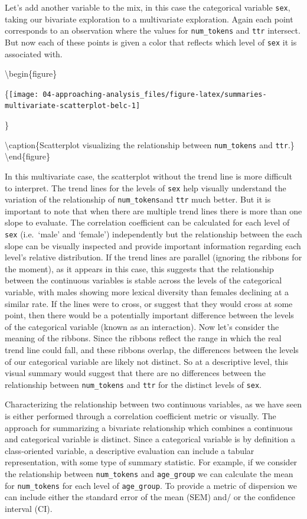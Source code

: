 \documentclass[
]{article}
\begin{document}
Let's add another variable to the mix, in this case the categorical variable \texttt{sex}, taking our bivariate exploration to a multivariate exploration. Again each point corresponds to an observation where the values for \texttt{num\_tokens} and \texttt{ttr} intersect. But now each of these points is given a color that reflects which level of \texttt{sex} it is associated with.

\textbackslash begin\{figure\}

\{\centering \texttt{[image: 04-approaching-analysis\_files/figure-latex/summaries-multivariate-scatterplot-belc-1]}

\}

\textbackslash caption\{Scatterplot visualizing the relationship between \texttt{num\_tokens} and \texttt{ttr}.\}\label{fig:summaries-multivariate-scatterplot-belc}
\textbackslash end\{figure\}

In this multivariate case, the scatterplot without the trend line is more difficult to interpret. The trend lines for the levels of \texttt{sex} help visually understand the variation of the relationship of \texttt{num\_tokens}and \texttt{ttr} much better. But it is important to note that when there are multiple trend lines there is more than one slope to evaluate. The correlation coefficient can be calculated for each level of \texttt{sex} (i.e.~`male' and `female') independently but the relationship between the each slope can be visually inspected and provide important information regarding each level's relative distribution. If the trend lines are parallel (ignoring the ribbons for the moment), as it appears in this case, this suggests that the relationship between the continuous variables is stable across the levels of the categorical variable, with males showing more lexical diversity than females declining at a similar rate. If the lines were to cross, or suggest that they would cross at some point, then there would be a potentially important difference between the levels of the categorical variable (known as an interaction). Now let's consider the meaning of the ribbons. Since the ribbons reflect the range in which the real trend line could fall, and these ribbons overlap, the differences between the levels of our categorical variable are likely not distinct. So at a descriptive level, this visual summary would suggest that there are no differences between the relationship between \texttt{num\_tokens} and \texttt{ttr} for the distinct levels of \texttt{sex}.

Characterizing the relationship between two continuous variables, as we have seen is either performed through a correlation coefficient metric or visually. The approach for summarizing a bivariate relationship which combines a continuous and categorical variable is distinct. Since a categorical variable is by definition a class-oriented variable, a descriptive evaluation can include a tabular representation, with some type of summary statistic. For example, if we consider the relationship between \texttt{num\_tokens} and \texttt{age\_group} we can calculate the mean for \texttt{num\_tokens} for each level of \texttt{age\_group}. To provide a metric of dispersion we can include either the standard error of the mean (SEM) and/ or the confidence interval (CI).
\end{document}
